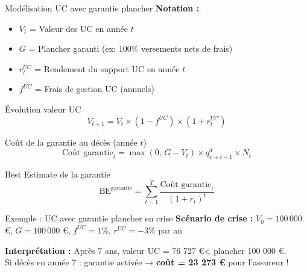 \documentclass[10pt,aspectratio=169]{beamer}
\newcommand{\highlight}[1]{\textbf{\color{rougeactu}#1}}
\newcommand{\BE}{\text{BE}}
\newcommand{\EUR}{€}
\begin{document}
\begin{frame}{Modélisation UC avec garantie plancher}
\textbf{Notation :}
\begin{itemize}
    \item $V_t$ = Valeur des UC en année $t$
    \item $G$ = Plancher garanti (ex: 100\% versements nets de frais)
    \item $r_t^{UC}$ = Rendement du support UC en année $t$
    \item $f^{UC}$ = Frais de gestion UC (annuels)
\end{itemize}

\vspace{0.3cm}
\begin{block}{Évolution valeur UC}
\[
\boxed{V_{t+1} = V_t \times (1 - f^{UC}) \times (1 + r_t^{UC})}
\]
\end{block}

\begin{block}{Coût de la garantie au décès (année $t$)}
\[
\boxed{\text{Coût garantie}_t = \max(0, \, G - V_t) \times q_{x+t-1}^d \times N_t}
\]
\end{block}

\begin{block}{Best Estimate de la garantie}
\[
\boxed{\BE^{\text{garantie}} = \sum_{t=1}^{T} \frac{\text{Coût garantie}_t}{(1+r_t)^t}}
\]
\end{block}
\end{frame}

\begin{frame}{Exemple : UC avec garantie plancher en crise}
\textbf{Scénario de crise :} $V_0 = 100\,000$ \EUR, $G = 100\,000$ \EUR, $f^{UC} = 1\%$, $r^{UC} = -3\%$ par an

\vspace{0.3cm}
\begin{center}
\end{center}

\textbf{Interprétation :} Après 7 ans, valeur UC = 76 727 \EUR < plancher 100 000 \EUR.\\
Si décès en année 7 : garantie activée → \highlight{coût = 23 273 \EUR} pour l'assureur !
\end{frame}
\end{document}
